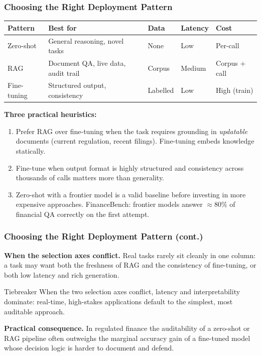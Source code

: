 \documentclass[9pt,t]{beamer}
\begin{document}
\begin{frame}
\frametitle{Choosing the Right Deployment Pattern}

\begin{center}
\begin{tabular}{lllll}
\toprule
\textbf{Pattern} & \textbf{Best for} & \textbf{Data} & \textbf{Latency} & \textbf{Cost} \\
\midrule
Zero-shot & General reasoning, novel tasks & None & Low & Per-call \\
RAG & Document QA, live data, audit trail & Corpus & Medium & Corpus + call \\
Fine-tuning & Structured output, consistency & Labelled & Low & High (train) \\
\bottomrule
\end{tabular}
\end{center}

\medskip
\textbf{Three practical heuristics:}
\begin{enumerate}
  \item Prefer RAG over fine-tuning when the task requires grounding in \emph{updatable} documents (current regulation, recent filings). Fine-tuning embeds knowledge statically.
  \item Fine-tune when output format is highly structured and consistency across thousands of calls matters more than generality.
  \item Zero-shot with a frontier model is a valid baseline before investing in more expensive approaches. FinanceBench: frontier models answer $\approx$80\% of financial QA correctly on the first attempt.
\end{enumerate}
\end{frame}

\begin{frame}
\frametitle{Choosing the Right Deployment Pattern (cont.)}

\textbf{When the selection axes conflict.} Real tasks rarely sit cleanly in one
column: a task may want both the freshness of RAG and the consistency of
fine-tuning, or both low latency and rich generation.

\medskip
\begin{alertblock}{Tiebreaker}
  When the two selection axes conflict, latency and interpretability dominate:
  real-time, high-stakes applications default to the simplest, most auditable approach.
\end{alertblock}

\medskip
\textbf{Practical consequence.} In regulated finance the auditability of a
zero-shot or RAG pipeline often outweighs the marginal accuracy gain of a
fine-tuned model whose decision logic is harder to document and defend.
\end{frame}
\end{document}
